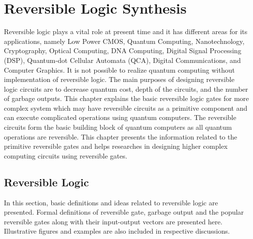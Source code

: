 

\chapter{Reversible Logic Synthesis}
\label{ch:part1_chapter1}


Reversible logic plays a vital role at present time and it has different areas for its applications, namely Low Power CMOS, Quantum Computing, Nanotechnology, Cryptography,
Optical Computing, DNA Computing, Digital Signal Processing (DSP), Quantum-dot Cellular Automata (QCA), Digital Communications, and Computer Graphics. It is not possible to realize quantum computing without implementation of reversible logic. The main purposes of designing reversible logic circuits are to decrease quantum cost, depth of the circuits, and the number of garbage outputs.%
This chapter explains the basic reversible logic gates for more complex system which may have reversible circuits as a primitive component and can execute complicated operations using quantum computers. The reversible circuits form the basic building block of quantum computers as all quantum operations are reversible. This chapter presents the information related to the primitive reversible gates and helps researches in designing higher complex computing circuits using reversible gates.


\section{Reversible Logic}
In this section, basic definitions and ideas related to reversible logic are presented. Formal definitions of reversible gate, garbage output and the popular reversible gates along with their input-output vectors are presented here.
Illustrative figures and examples are also included in respective discussions.

